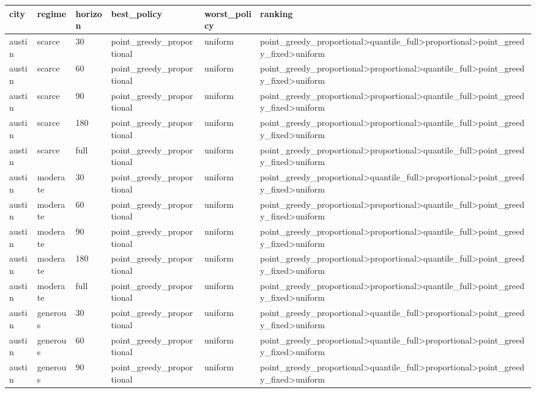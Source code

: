 \begin{tabular}{llllll}
\toprule
city & regime & horizon & best\_policy & worst\_policy & ranking \\
\midrule
austin & scarce & 30 & point\_greedy\_proportional & uniform & point\_greedy\_proportional>quantile\_full>proportional>point\_greedy\_fixed>uniform \\
austin & scarce & 60 & point\_greedy\_proportional & uniform & point\_greedy\_proportional>proportional>quantile\_full>point\_greedy\_fixed>uniform \\
austin & scarce & 90 & point\_greedy\_proportional & uniform & point\_greedy\_proportional>proportional>quantile\_full>point\_greedy\_fixed>uniform \\
austin & scarce & 180 & point\_greedy\_proportional & uniform & point\_greedy\_proportional>proportional>quantile\_full>point\_greedy\_fixed>uniform \\
austin & scarce & full & point\_greedy\_proportional & uniform & point\_greedy\_proportional>proportional>quantile\_full>point\_greedy\_fixed>uniform \\
austin & moderate & 30 & point\_greedy\_proportional & uniform & point\_greedy\_proportional>quantile\_full>proportional>point\_greedy\_fixed>uniform \\
austin & moderate & 60 & point\_greedy\_proportional & uniform & point\_greedy\_proportional>proportional>quantile\_full>point\_greedy\_fixed>uniform \\
austin & moderate & 90 & point\_greedy\_proportional & uniform & point\_greedy\_proportional>proportional>quantile\_full>point\_greedy\_fixed>uniform \\
austin & moderate & 180 & point\_greedy\_proportional & uniform & point\_greedy\_proportional>proportional>quantile\_full>point\_greedy\_fixed>uniform \\
austin & moderate & full & point\_greedy\_proportional & uniform & point\_greedy\_proportional>proportional>quantile\_full>point\_greedy\_fixed>uniform \\
austin & generous & 30 & point\_greedy\_proportional & uniform & point\_greedy\_proportional>quantile\_full>proportional>point\_greedy\_fixed>uniform \\
austin & generous & 60 & point\_greedy\_proportional & uniform & point\_greedy\_proportional>quantile\_full>proportional>point\_greedy\_fixed>uniform \\
austin & generous & 90 & point\_greedy\_proportional & uniform & point\_greedy\_proportional>quantile\_full>proportional>point\_greedy\_fixed>uniform \\

\end{tabular}
